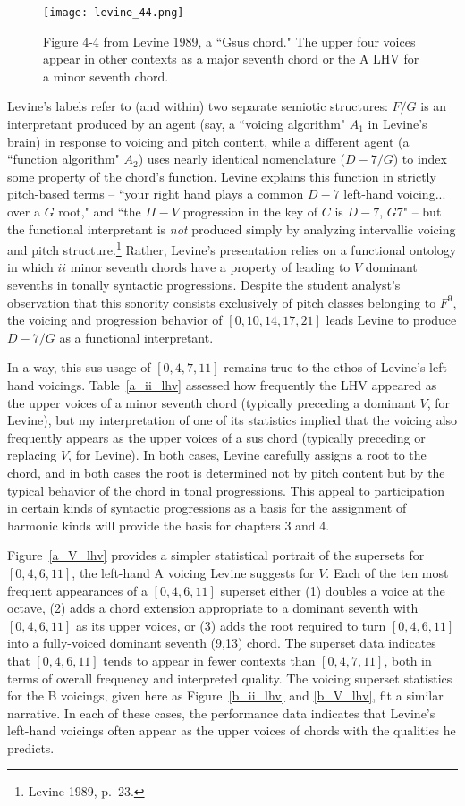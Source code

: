 \begin{figure}
	\centering
	\caption{Figure 4-4 from Levine 1989, a ``Gsus chord."  The upper four voices appear in other contexts as a major seventh chord or the A LHV for a minor seventh chord.}
	\texttt{[image: levine\_44.png]}
	\label{Gsus}
\end{figure}

Levine's labels refer to (and within) two separate semiotic structures: $F/G$ is an interpretant produced by an agent (say, a ``voicing algorithm" $A_1$ in Levine's brain) in response to voicing and pitch content, while a different agent (a ``function algorithm" $A_2$) uses nearly identical nomenclature ($D-7/G$) to index some property of the chord's function.  Levine explains this function in strictly pitch-based terms -- ``your right hand plays a common $D-7$ left-hand voicing... over a $G$ root," and ``the $II-V$ progression in the key of $C$ is $D-7$, $G7$" -- but the functional interpretant is \emph{not} produced simply by analyzing intervallic voicing and pitch structure.\footnote{Levine 1989, p.\ 23.}  Rather, Levine's presentation relies on a functional ontology in which $ii$ minor seventh chords have a property of leading to $V$ dominant sevenths in tonally syntactic progressions.   Despite the student analyst's observation that this sonority consists exclusively of pitch classes belonging to $F^9$, the voicing and progression behavior of $[0,10,14,17,21]$ leads Levine to produce $D-7/G$ as a functional interpretant.  

In a way, this sus-usage of $[0,4,7,11]$ remains true to the ethos of Levine's left-hand voicings.  Table~\ref{a_ii_lhv} assessed how frequently the LHV appeared as the upper voices of a minor seventh chord (typically preceding a dominant $V$, for Levine), but my interpretation of one of its statistics implied that the voicing also frequently appears as the upper voices of a sus chord (typically preceding or replacing $V$, for Levine).  In both cases, Levine carefully assigns a root to the chord, and in both cases the root is determined not by pitch content but by the typical behavior of the chord in tonal progressions.  This appeal to participation in certain kinds of syntactic progressions as a basis for the assignment of harmonic kinds will provide the basis for chapters 3 and 4.

Figure~\ref{a_V_lhv} provides a simpler statistical portrait of the supersets for $[0,4,6,11]$, the left-hand A voicing Levine suggests for $V$.  Each of the ten most frequent appearances of a $[0,4,6,11]$ superset either (1) doubles a voice at the octave, (2) adds a chord extension appropriate to a dominant seventh with $[0,4,6,11]$ as its upper voices, or (3) adds the root required to turn $[0,4,6,11]$ into a fully-voiced dominant seventh (9,13) chord.  The superset data indicates that $[0,4,6,11]$ tends to appear in fewer contexts than $[0,4,7,11]$, both in terms of overall frequency and interpreted quality.  The voicing superset statistics for the B voicings, given here as Figure~\ref{b_ii_lhv} and \ref{b_V_lhv}, fit a similar narrative.  In each of these cases, the performance data indicates that Levine's left-hand voicings often appear as the upper voices of chords with the qualities he predicts.

